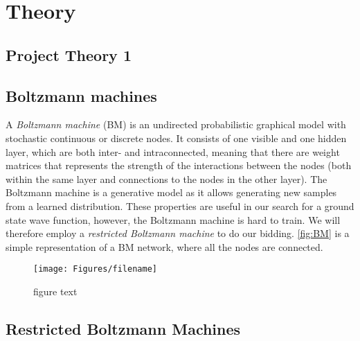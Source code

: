 \section{Theory}\label{sec:Theory}

\subsection{Project Theory 1}\label{sec:project theory}

\subsection{Boltzmann machines}
A \textit{Boltzmann machine} (BM) is an undirected probabilistic graphical model with stochastic continuous or discrete nodes. It consists of one visible and one hidden layer, which are both inter- and intraconnected, meaning that there are weight matrices that represents the strength of the interactions between the nodes (both within the same layer and connections to the nodes in the other layer). The Boltzmann machine is a generative model as it allows generating new samples from a learned distribution. These properties are useful in our search for a ground state wave function, however, the Boltzmann machine is hard to train. We will therefore employ a \textit{restricted Boltzmann machine} to do our bidding.  \autoref{fig:BM} is a simple representation of a BM network, where all the nodes are connected. 

\begin{figure}[H]
\begin{center}\texttt{[image: Figures/filename]}
\end{center}
\caption{figure text}
\label{fig:fig1}
\end{figure}

\subsection{Restricted Boltzmann Machines}





